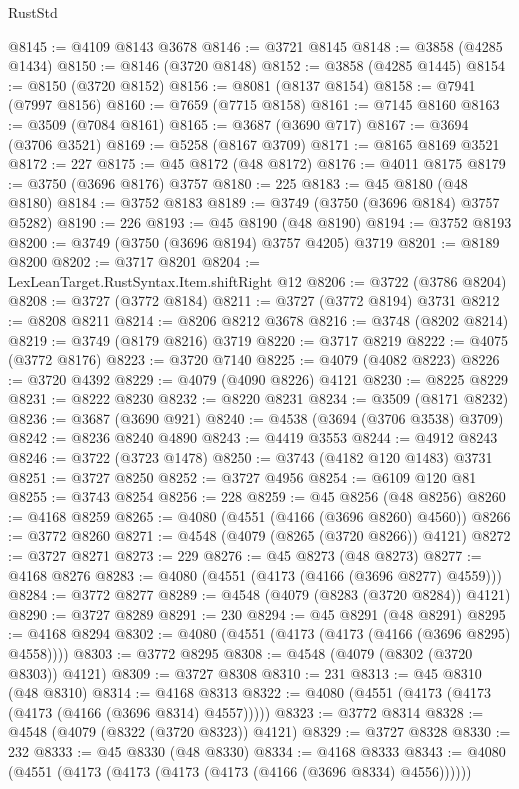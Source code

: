 \begin{lexlean}{RustStd}
\begin{coremodule}
@8145 := @4109 @8143 @3678
@8146 := @3721 @8145
@8148 := @3858 (@4285 @1434)
@8150 := @8146 (@3720 @8148)
@8152 := @3858 (@4285 @1445)
@8154 := @8150 (@3720 @8152)
@8156 := @8081 (@8137 @8154)
@8158 := @7941 (@7997 @8156)
@8160 := @7659 (@7715 @8158)
@8161 := @7145 @8160
@8163 := @3509 (@7084 @8161)
@8165 := @3687 (@3690 @717)
@8167 := @3694 (@3706 @3521)
@8169 := @5258 (@8167 @3709)
@8171 := @8165 @8169 @3521
@8172 := 227
@8175 := @45 @8172 (@48 @8172)
@8176 := @4011 @8175
@8179 := @3750 (@3696 @8176) @3757
@8180 := 225
@8183 := @45 @8180 (@48 @8180)
@8184 := @3752 @8183
@8189 := @3749 (@3750 (@3696 @8184) @3757 @5282)
@8190 := 226
@8193 := @45 @8190 (@48 @8190)
@8194 := @3752 @8193
@8200 := @3749 (@3750 (@3696 @8194) @3757 @4205) @3719
@8201 := @8189 @8200
@8202 := @3717 @8201
@8204 := LexLeanTarget.RustSyntax.Item.shiftRight @12
@8206 := @3722 (@3786 @8204)
@8208 := @3727 (@3772 @8184)
@8211 := @3727 (@3772 @8194) @3731
@8212 := @8208 @8211
@8214 := @8206 @8212 @3678
@8216 := @3748 (@8202 @8214)
@8219 := @3749 (@8179 @8216) @3719
@8220 := @3717 @8219
@8222 := @4075 (@3772 @8176)
@8223 := @3720 @7140
@8225 := @4079 (@4082 @8223)
@8226 := @3720 @4392
@8229 := @4079 (@4090 @8226) @4121
@8230 := @8225 @8229
@8231 := @8222 @8230
@8232 := @8220 @8231
@8234 := @3509 (@8171 @8232)
@8236 := @3687 (@3690 @921)
@8240 := @4538 (@3694 (@3706 @3538) @3709)
@8242 := @8236 @8240 @4890
@8243 := @4419 @3553
@8244 := @4912 @8243
@8246 := @3722 (@3723 @1478)
@8250 := @3743 (@4182 @120 @1483) @3731
@8251 := @3727 @8250
@8252 := @3727 @4956
@8254 := @6109 @120 @81
@8255 := @3743 @8254
@8256 := 228
@8259 := @45 @8256 (@48 @8256)
@8260 := @4168 @8259
@8265 := @4080 (@4551 (@4166 (@3696 @8260) @4560))
@8266 := @3772 @8260
@8271 := @4548 (@4079 (@8265 (@3720 @8266)) @4121)
@8272 := @3727 @8271
@8273 := 229
@8276 := @45 @8273 (@48 @8273)
@8277 := @4168 @8276
@8283 := @4080 (@4551 (@4173 (@4166 (@3696 @8277) @4559)))
@8284 := @3772 @8277
@8289 := @4548 (@4079 (@8283 (@3720 @8284)) @4121)
@8290 := @3727 @8289
@8291 := 230
@8294 := @45 @8291 (@48 @8291)
@8295 := @4168 @8294
@8302 := @4080 (@4551 (@4173 (@4173 (@4166 (@3696 @8295) @4558))))
@8303 := @3772 @8295
@8308 := @4548 (@4079 (@8302 (@3720 @8303)) @4121)
@8309 := @3727 @8308
@8310 := 231
@8313 := @45 @8310 (@48 @8310)
@8314 := @4168 @8313
@8322 := @4080 (@4551 (@4173 (@4173 (@4173 (@4166 (@3696 @8314) @4557)))))
@8323 := @3772 @8314
@8328 := @4548 (@4079 (@8322 (@3720 @8323)) @4121)
@8329 := @3727 @8328
@8330 := 232
@8333 := @45 @8330 (@48 @8330)
@8334 := @4168 @8333
@8343 := @4080 (@4551 (@4173 (@4173 (@4173 (@4173 (@4166 (@3696 @8334) @4556))))))

\end{coremodule}
\end{lexlean}
